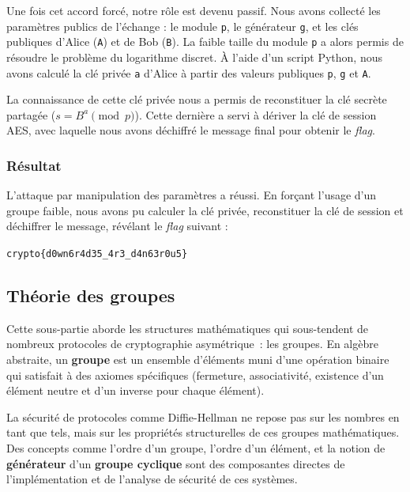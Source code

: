 \documentclass[12pt, a4paper]{article}
\begin{document}
    Une fois cet accord forcé, notre rôle est devenu passif. Nous avons
    collecté les paramètres publics de l'échange : le module \texttt{p}, le
    générateur \texttt{g}, et les clés publiques d'Alice (\texttt{A}) et de
    Bob (\texttt{B}). La faible taille du module \texttt{p} a alors permis de
    résoudre le problème du logarithme discret. À l'aide d'un script Python, nous
    avons calculé la clé privée \texttt{a} d'Alice à partir des valeurs publiques
    \texttt{p}, \texttt{g} et \texttt{A}.

    La connaissance de cette clé privée nous a permis de reconstituer la clé
    secrète partagée ($s = B^a \pmod{p}$). Cette dernière a servi à dériver la
    clé de session AES, avec laquelle nous avons déchiffré le message final
    pour obtenir le \textit{flag}.

    \subsubsection{Résultat}
    L'attaque par manipulation des paramètres a réussi. En forçant l'usage d'un
    groupe faible, nous avons pu calculer la clé privée, reconstituer la clé de
    session et déchiffrer le message, révélant le \textit{flag} suivant :

    \begin{center}
        \texttt{crypto\{d0wn6r4d35\_4r3\_d4n63r0u5\}}
    \end{center}

    \subsection{Théorie des groupes}
    Cette sous-partie aborde les structures mathématiques qui sous-tendent de
    nombreux protocoles de cryptographie asymétrique~: les groupes. En
    algèbre abstraite, un \textbf{groupe} est un ensemble d'éléments muni d'une
    opération binaire qui satisfait à des axiomes spécifiques (fermeture,
    associativité, existence d'un élément neutre et d'un inverse pour chaque
    élément).

    La sécurité de protocoles comme Diffie-Hellman ne repose pas sur les
    nombres en tant que tels, mais sur les propriétés structurelles de ces
    groupes mathématiques. Des concepts comme l'ordre d'un groupe, l'ordre
    d'un élément, et la notion de \textbf{générateur} d'un \textbf{groupe
    cyclique} sont des composantes directes de l'implémentation et de
    l'analyse de sécurité de ces systèmes.
\end{document}
